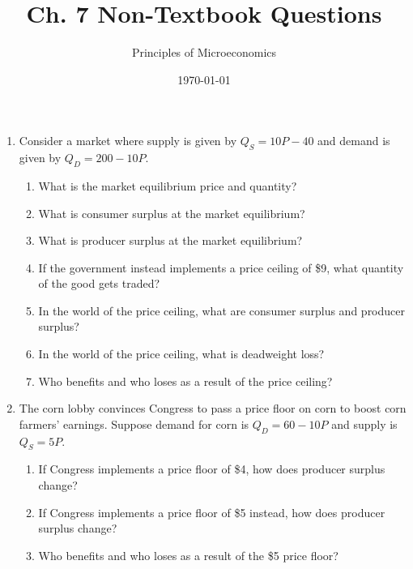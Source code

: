 \documentclass{article}
\title{Ch. 7 Non-Textbook Questions}
\author{Principles of Microeconomics}
\date{\today}
\begin{document}
\maketitle

\begin{enumerate}

\item Consider a market where supply is given by $Q_S = 10P - 40$ and demand is given by $Q_D = 200 - 10P$.

	\begin{enumerate}
	
	\item What is the market equilibrium price and quantity?
	
	\item What is consumer surplus at the market equilibrium?
	
	\item What is producer surplus at the market equilibrium?
	
	\item If the government instead implements a price ceiling of \$9, what quantity of the good gets traded?
	
	\item In the world of the price ceiling, what are consumer surplus and producer surplus?
	
	\item In the world of the price ceiling, what is deadweight loss?
	
	\item Who benefits and who loses as a result of the price ceiling?
	
	\end{enumerate}
	
\item The corn lobby convinces Congress to pass a price floor on corn to boost corn farmers' earnings. Suppose demand for corn is $Q_D = 60 - 10P$ and supply is $Q_S = 5P$.

	\begin{enumerate}
	
	\item If Congress implements a price floor of \$4, how does producer surplus change?
	
	\item If Congress implements a price floor of \$5 instead, how does producer surplus change?
	
	\item Who benefits and who loses as a result of the \$5 price floor?
	

\end{enumerate}
\end{enumerate}
\end{document}
